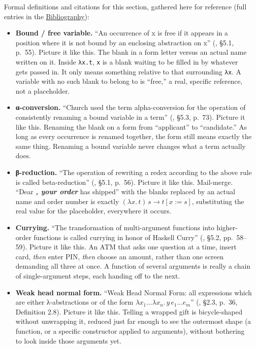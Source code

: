 Formal definitions and citations for this section, gathered here for reference (full entries in the \hyperref[sec:root:bibliography:1]{Bibliography}):

\begin{itemize}
\tightlist
\item
  \textbf{Bound / free variable.} ``An occurrence of x is free if it appears in a position where it is not bound by an enclosing abstraction on x'' (\cite{Pierce2002}, §5.1, p.~55). Picture it like this. The blank in a form letter versus an actual name written on it. Inside \texttt{λx.t}, \texttt{x} is a blank waiting to be filled in by whatever gets passed in. It only means something relative to that surrounding \texttt{λx}. A variable with no such blank to belong to is ``free,'' a real, specific reference, not a placeholder.
\item
  \textbf{α-conversion.} ``Church used the term alpha-conversion for the operation of consistently renaming a bound variable in a term'' (\cite{Pierce2002}, §5.3, p.~73). Picture it like this. Renaming the blank on a form from ``applicant'' to ``candidate.'' As long as every occurrence is renamed together, the form still means exactly the same thing. Renaming a bound variable never changes what a term actually does.
\item
  \textbf{β-reduction.} ``The operation of rewriting a redex according to the above rule is called beta-reduction'' (\cite{Pierce2002}, §5.1, p.~56). Picture it like this. Mail-merge. ``Dear \textbf{\emph{, your order }} has shipped'' with the blanks replaced by an actual name and order number is exactly \((\lambda x.\, t)\, s \to t[x := s]\), substituting the real value for the placeholder, everywhere it occurs.
\item
  \textbf{Currying.} ``The transformation of multi-argument functions into higher-order functions is called currying in honor of Haskell Curry'' (\cite{Pierce2002}, §5.2, pp.~58--59). Picture it like this. An ATM that asks one question at a time, insert card, \emph{then} enter PIN, \emph{then} choose an amount, rather than one screen demanding all three at once. A function of several arguments is really a chain of single-argument steps, each handing off to the next.
\item
  \textbf{Weak head normal form.} ``Weak Head Normal Form: all expressions which are either λ-abstractions or of the form \(\lambda x_1 \ldots \lambda x_n.\, y\, e_1 \ldots e_m\)'' (\cite{Thompson1991}, §2.3, p.~36, Definition 2.8). Picture it like this. Telling a wrapped gift is bicycle-shaped without unwrapping it, reduced just far enough to see the outermost shape (a function, or a specific constructor applied to arguments), without bothering to look inside those arguments yet.

\end{itemize}
